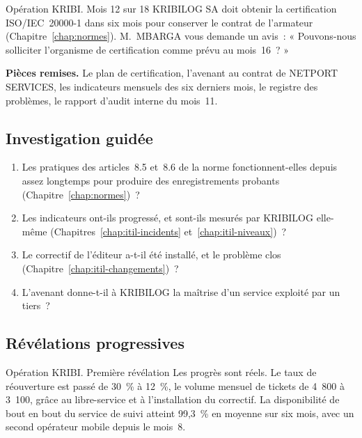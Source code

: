 \begin{boxscenario}{Opération KRIBI. Mois 12 sur 18}
KRIBILOG SA doit obtenir la certification ISO/IEC~20000-1 dans six mois
pour conserver le contrat de l'armateur (Chapitre~\ref{chap:normes}).
M.~MBARGA vous demande un avis~: « Pouvons-nous solliciter l'organisme de
certification comme prévu au mois~16~? »

\medskip
\textbf{Pièces remises.} Le plan de certification, l'avenant au contrat de
NETPORT SERVICES, les indicateurs mensuels des six derniers mois, le
registre des problèmes, le rapport d'audit interne du mois~11.
\end{boxscenario}

\subsection{Investigation guidée}

\begin{enumerate}
    \item Les pratiques des articles~8.5 et~8.6 de la norme
          fonctionnent-elles depuis assez longtemps pour produire des
          enregistrements probants (Chapitre~\ref{chap:normes})~?
    \item Les indicateurs ont-ils progressé, et sont-ils mesurés par
          KRIBILOG elle-même (Chapitres~\ref{chap:itil-incidents}
          et~\ref{chap:itil-niveaux})~?
    \item Le correctif de l'éditeur a-t-il été installé, et le problème
          clos (Chapitre~\ref{chap:itil-changements})~?
    \item L'avenant donne-t-il à KRIBILOG la maîtrise d'un service exploité
          par un tiers~?
\end{enumerate}

\subsection{Révélations progressives}

\begin{boxscenario}{Opération KRIBI. Première révélation}
Les progrès sont réels. Le taux de réouverture est passé de 30~\% à 12~\%,
le volume mensuel de tickets de 4~800 à 3~100, grâce au libre-service et à
l'installation du correctif. La disponibilité de bout en bout du service
de suivi atteint 99,3~\% en moyenne sur six mois, avec un second
opérateur mobile depuis le mois~8.
\end{boxscenario}

